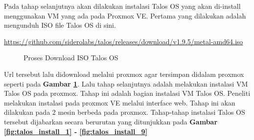 Pada tahap selanjutnya akan dilakukan instalasi Talos OS yang akan di-install
menggunakan VM yang ada pada Proxmox VE. Pertama yang dilakukan adalah
mengunduh ISO file Talos OS di sini.

\url{https://github.com/siderolabs/talos/releases/download/v1.9.5/metal-amd64.iso}

\begin{figure}[H]
  \centering
  \caption{Proses Download ISO Talos OS}
  \label{fig:talos_download}
\end{figure}

Url tersebut lalu didownload melalui proxmox agar tersimpan didalam proxmox
seperti pada \textbf{Gambar \ref{fig:talos_download}}. Lalu tahap selanjutnya
adalah melakukan instalasi VM Talos OS pada proxmox. Tahap ini adalah bagian
instalasi VM Talos OS. Peneliti melakukan instalasi pada proxmox VE melalui
interface web. Tahap ini akan dilakukan pada 2 mesin berbeda pada proxmox.
Tahap-tahap instalasi Talos OS tersebut dijabarkan secara berurutan yang
ditunjukkan pada \textbf{Gambar \ref{fig:talos_install_1} -
  \ref{fig:talos_install_9}}

